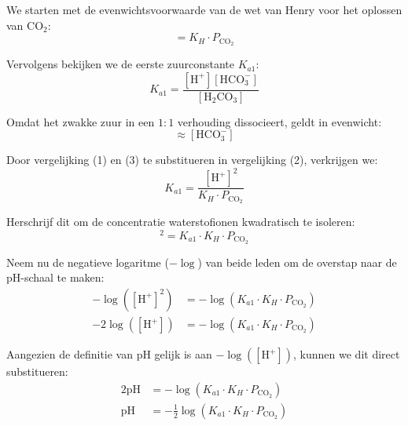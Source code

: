\documentclass{article}
\begin{document}
We starten met de evenwichtsvoorwaarde van de wet van Henry voor het oplossen van $\text{CO}_2$:
\begin{equation}
    [\text{H}_2\text{CO}_3] = K_H \cdot P_{\text{CO}_2}
\end{equation}

Vervolgens bekijken we de eerste zuurconstante $K_{a1}$:
\begin{equation}
    K_{a1} = \frac{[\text{H}^+][\text{HCO}_3^-]}{[\text{H}_2\text{CO}_3]}
\end{equation}

Omdat het zwakke zuur in een $1:1$ verhouding dissocieert, geldt in evenwicht:
\begin{equation}
    [\text{H}^+] \approx [\text{HCO}_3^-]
\end{equation}

Door vergelijking (1) en (3) te substitueren in vergelijking (2), verkrijgen we:
\begin{equation}
    K_{a1} = \frac{[\text{H}^+]^2}{K_H \cdot P_{\text{CO}_2}}
\end{equation}

Herschrijf dit om de concentratie waterstofionen kwadratisch te isoleren:
\begin{equation}
    [\text{H}^+]^2 = K_{a1} \cdot K_H \cdot P_{\text{CO}_2}
\end{equation}

Neem nu de negatieve logaritme ($-\log$) van beide leden om de overstap naar de pH-schaal te maken:
\begin{align*}
    -\log\left([\text{H}^+]^2\right) &= -\log(K_{a1} \cdot K_H \cdot P_{\text{CO}_2}) \\
    -2\log([\text{H}^+]) &= -\log(K_{a1} \cdot K_H \cdot P_{\text{CO}_2})
\end{align*}

Aangezien de definitie van pH gelijk is aan $-\log([\text{H}^+])$, kunnen we dit direct substitueren:
\begin{align*}
    2\text{pH} &= -\log(K_{a1} \cdot K_H \cdot P_{\text{CO}_2}) \\
    \text{pH} &= -\frac{1}{2}\log(K_{a1} \cdot K_H \cdot P_{\text{CO}_2})
\end{align*}
\end{document}
